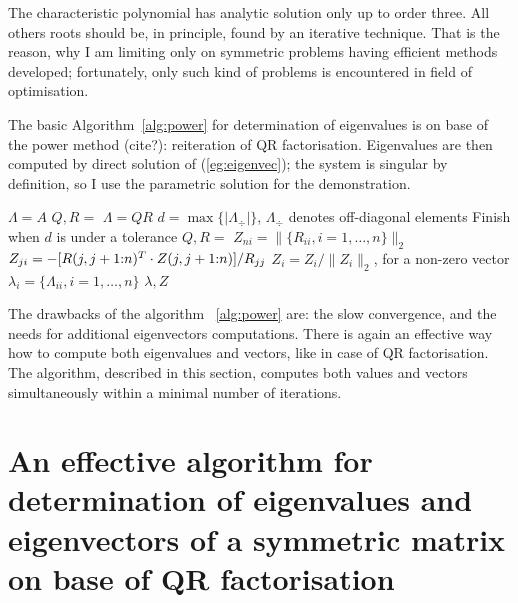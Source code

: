 \begin{refsection}
The characteristic polynomial has analytic solution only
up to order three. All others roots should be, in principle,
found by an iterative technique. That is the reason, why I am
limiting only on symmetric problems having efficient methods developed;
fortunately, only such kind of problems is encountered in field of optimisation.

The basic Algorithm~\ref{alg:power} for determination of eigenvalues is
on base of the power method (cite?): reiteration of QR factorisation.
Eigenvalues are then computed by direct solution of (\ref{eg:eigenvec});
the system is singular by definition, so I use the parametric solution
for the demonstration.


\begin{algorithm}
  \caption{Outline for determination of eigenvalues and vectors}
  \label{alg:power}
  \begin{algorithmic}
    \State {}
    \State $\Lambda = A$
    \State $Q,R = $ 
    \State $\Lambda = Q R$
    \State $d = \max\{\lvert \Lambda_{\div} \rvert\}$,
    $\Lambda_{\div}$ denotes off-diagonal elements
    \State Finish when $d$ is under a tolerance
    \EndFor
    \State $Q,R = $ 
    \State $Z_{ni} = \lVert \{ R_{ii}, i = 1, \ldots, n \} \rVert_2$
    \State $Z_{ji} = -[R(j,j+1{:}n)^T \cdot Z(j,j+1{:}n)] / R_{jj}$
    \EndFor
    \State $Z_i = Z_i / \lVert Z_i \rVert_2$, for a non-zero vector
    \EndFor
    \State $\lambda_i = \{ \Lambda_{ii}, i = 1, \ldots, n \}$
    \State \Return $\lambda, Z$
  \end{algorithmic}
\end{algorithm}

The drawbacks of the algorithm ~\ref{alg:power} are:
the slow convergence, and the needs for additional eigenvectors computations.
There is again an effective way how to compute both eigenvalues and vectors,
like in case of QR factorisation.
The algorithm, described in this section,
computes both values and vectors simultaneously
within a minimal number of iterations.


\section[An effective eigenvalue decomposition]{An effective algorithm for
  determination of eigenvalues and eigenvectors of a symmetric matrix on base
  of QR factorisation}


\end{refsection}
